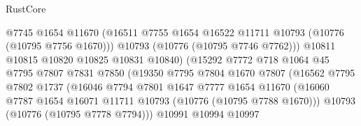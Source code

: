 \begin{lexlean}{RustCore}
\begin{coremodule}
                                      @7745
                                      @1654
                                      @11670
                                      (@16511
                                        @7755
                                        @1654
                                        @16522
                                        @11711
                                        @10793
                                        (@10776 (@10795 @7756 @1670)))
                                      @10793
                                      (@10776 (@10795 @7746 @7762)))
                                    @10811
                                    @10815
                                    @10820
                                    @10825
                                    @10831
                                    @10840)
                                  (@15292
                                    @7772
                                    @718
                                    @1064
                                    @45
                                    @7795
                                    @7807
                                    @7831
                                    @7850
                                    (@19350
                                      @7795
                                      @7804
                                      @1670
                                      @7807
                                      (@16562
                                        @7795
                                        @7802
                                        @1737
                                        (@16046
                                          @7794
                                          @7801
                                          @1647
                                          @7777
                                          @1654
                                          @11670
                                          (@16060
                                            @7787
                                            @1654
                                            @16071
                                            @11711
                                            @10793
                                            (@10776 (@10795 @7788 @1670)))
                                          @10793
                                          (@10776 (@10795 @7778 @7794)))
                                        @10991
                                        @10994
                                        @10997

\end{coremodule}
\end{lexlean}
